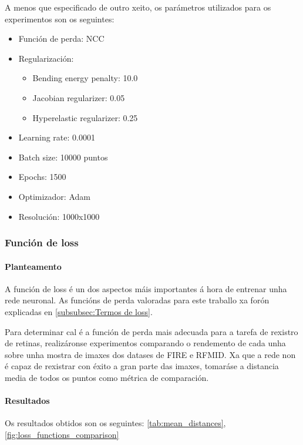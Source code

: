 A menos que especificado de outro xeito, os parámetros utilizados para os experimentos son os seguintes:
\begin{itemize}
    \item Función de perda: NCC
    \item Regularización:
    \begin{itemize}
         \item Bending energy penalty: 10.0
         \item Jacobian regularizer: 0.05
         \item Hyperelastic regularizer: 0.25
    \end{itemize}
    \item Learning rate: 0.0001
    \item Batch size: 10000 puntos
    \item Epochs: 1500
    \item Optimizador: Adam
    \item Resolución: 1000x1000
\end{itemize}


\subsubsection{Función de loss}
\label{subsubsec:Función de loss}

\paragraph{Planteamento}
\label{par:Planteamento}

A función de loss é un dos aspectos máis importantes á hora de entrenar unha rede neuronal.
As funcións de perda valoradas para este traballo xa forón explicadas en \ref{subsubsec:Termos de loss}.

Para determinar cal é a función de perda mais adecuada para a tarefa de rexistro de retinas, realizáronse experimentos comparando o rendemento de cada unha sobre unha mostra de imaxes dos datases de FIRE e RFMID.
Xa que a rede non é capaz de rexistrar con éxito a gran parte das imaxes, tomaráse a distancia media de todos os puntos como métrica de comparación.

\paragraph{Resultados}
\label{par:Resultados}

Os resultados obtidos son os seguintes: \ref{tab:mean_distances}, \ref{fig:loss_functions_comparison}

